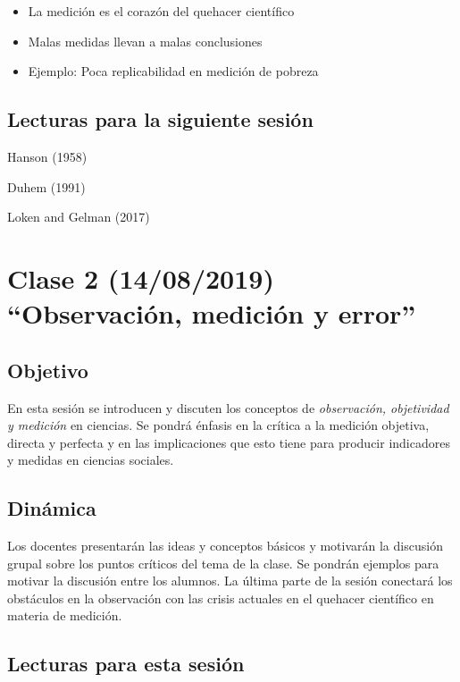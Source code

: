 \documentclass[11pt,]{article}
\providecommand{\tightlist}{%
  \setlength{\itemsep}{0pt}\setlength{\parskip}{0pt}}
\begin{document}
\begin{itemize}
\tightlist
\item
  La medición es el corazón del quehacer científico
\item
  Malas medidas llevan a malas conclusiones
\item
  Ejemplo: Poca replicabilidad en medición de pobreza
\end{itemize}

\hypertarget{lecturas-para-la-siguiente-sesion}{%
\subsection{Lecturas para la siguiente
sesión}\label{lecturas-para-la-siguiente-sesion}}

Hanson (1958)

Duhem (1991)

Loken and Gelman (2017)

\hypertarget{clase-2-14082019-observacion-medicion-y-error}{%
\section{Clase 2 (14/08/2019) ``Observación, medición y
error''}\label{clase-2-14082019-observacion-medicion-y-error}}

\hypertarget{objetivo-1}{%
\subsection{Objetivo}\label{objetivo-1}}

En esta sesión se introducen y discuten los conceptos de
\emph{observación, objetividad y medición} en ciencias. Se pondrá
énfasis en la crítica a la medición objetiva, directa y perfecta y en
las implicaciones que esto tiene para producir indicadores y medidas en
ciencias sociales.

\hypertarget{dinamica-1}{%
\subsection{Dinámica}\label{dinamica-1}}

Los docentes presentarán las ideas y conceptos básicos y motivarán la
discusión grupal sobre los puntos críticos del tema de la clase. Se
pondrán ejemplos para motivar la discusión entre los alumnos. La última
parte de la sesión conectará los obstáculos en la observación con las
crisis actuales en el quehacer científico en materia de medición.

\hypertarget{lecturas-para-esta-sesion}{%
\subsection{Lecturas para esta sesión}\label{lecturas-para-esta-sesion}}
\end{document}
